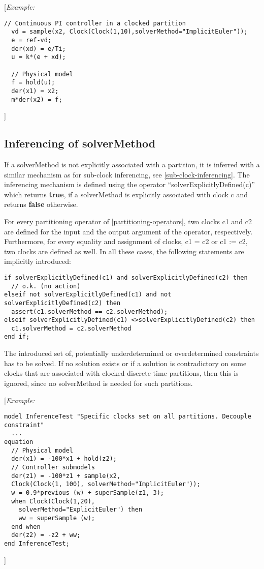{[}\emph{Example:}
\begin{lstlisting}[language=modelica]
  // Continuous PI controller in a clocked partition
  vd = sample(x2, Clock(Clock(1,10),solverMethod="ImplicitEuler"));
  e = ref-vd;
  der(xd) = e/Ti;
  u = k*(e + xd);

  // Physical model
  f = hold(u);
  der(x1) = x2;
  m*der(x2) = f;
\end{lstlisting}
{]}

\subsection{Inferencing of solverMethod}

If a solverMethod is not explicitly associated with a partition, it is
inferred with a similar mechanism as for sub-clock inferencing, see
\autoref{sub-clock-inferencing}. The inferencing mechanism is defined using the operator
``solverExplicitlyDefined(c)'' which returns \textbf{true}, if a
solverMethod is explicitly associated with clock c and returns
\textbf{false} otherwise.

For every partitioning operator of \autoref{partitioning-operators}, two clocks c1 and c2
are defined for the input and the output argument of the operator,
respectively. Furthermore, for every equality and assignment of clocks,
c1 = c2 or c1 := c2, two clocks are defined as well. In all these cases,
the following statements are implicitly introduced:

\begin{lstlisting}[language=modelica]
if solverExplicitlyDefined(c1) and solverExplicitlyDefined(c2) then
  // o.k. (no action)
elseif not solverExplicitlyDefined(c1) and not solverExplicitlyDefined(c2) then
  assert(c1.solverMethod == c2.solverMethod);
elseif solverExplicitlyDefined(c1) <>solverExplicitlyDefined(c2) then
  c1.solverMethod = c2.solverMethod
end if;
\end{lstlisting}

The introduced set of, potentially underdetermined or overdetermined
constraints has to be solved. If no solution exists or if a solution is
contradictory on some clocks that are associated with clocked
discrete-time partitions, then this is ignored, since no solverMethod is
needed for such partitions.

{[}\emph{Example:}

\begin{lstlisting}[language=modelica]
model InferenceTest "Specific clocks set on all partitions. Decouple constraint"
  ...
equation 
  // Physical model
  der(x1) = -100*x1 + hold(z2);
  // Controller submodels
  der(z1) = -100*z1 + sample(x2,
  Clock(Clock(1, 100), solverMethod="ImplicitEuler"));
  w = 0.9*previous (w) + superSample(z1, 3);
  when Clock(Clock(1,20),
    solverMethod="ExplicitEuler") then 
    ww = superSample (w);
  end when
  der(z2) = -z2 + ww;
end InferenceTest;
\end{lstlisting}
{]}

